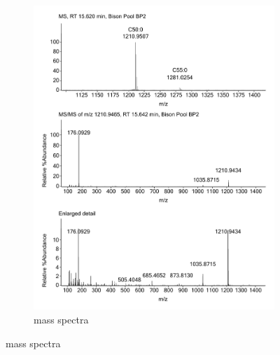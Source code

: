 \begin{figure}[h]
\centering
    \begin{subfigure}[b]{1\linewidth}
       \includegraphics[width=\linewidth]{figs_app1/MeNG-G-P-AR_1}
       \caption{mass spectra}
        \label{fig:gull}
    \end{subfigure}
\end{figure}
\newpage
